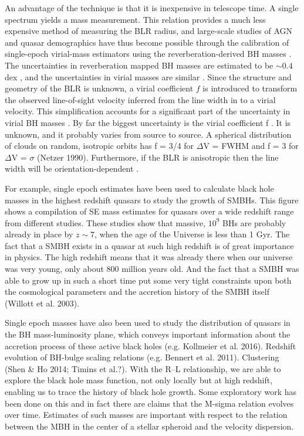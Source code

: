 An advantage of the technique is that it is inexpensive in telescope time. A single spectrum yields a mass measurement. 
This relation provides a much less expensive method of measuring the BLR radius, and large-scale studies of AGN and quasar demographics have thus become possible through the calibration of single-epoch virial-mass estimators using the reverberation-derived BH masses \citep[e.g.][]{greene05b,vestergaard06,vestergaard09,shen11,shen12,trakhtenbrot12}.
The uncertainties in reverberation mapped BH masses are estimated to be $\sim 0.4$ dex \citep[e.g.][]{peterson10}, and the uncertainties in virial masses are similar \citep[e.g.][]{vestergaard06}.
Since the structure and geometry of the BLR is unknown, a virial coefficient $f$ is introduced to transform the observed line-of-sight velocity inferred from the line width in to a virial velocity.
This simplification accounts for a significant part of the uncertainty in virial BH masses \citep[in addition to, for example, describing the BLR with a single radius $R$ and scatter in the $R-L$ relation;][]{shen13}. 
By far the biggest uncertainty is the virial coefficient f . 
It is unknown, and it probably varies from source to source.
A spherical distribution of clouds on random, isotropic orbits has f = 3/4 for $\Delta$V = FWHM and
f = 3 for $\Delta$V = $\sigma$ (Netzer 1990).
Furthermore, if the BLR is anisotropic \citep[for example, in a flattened disk; e.g.][]{jarvis06} then the line width will be orientation-dependent \citep[e.g.][]{runnoe13b,shen14,brotherton15}. 

For example, single epoch estimates have been used to calculate black hole masses in the highest redshift quasars to study the growth of SMBHs. 
This figure shows a compilation of SE mass estimates for quasars over a wide redshift range from different studies. 
These studies show that massive, $10^9$ BHs are probably already in place by $z\sim7$, when the age of the Universe is less than 1 Gyr.
The fact that a SMBH exists in a quasar at such high redshift is of great importance in physics.
The high redshift means that it was already there when our universe was very young, only about
800 million years old. And the fact that a SMBH was able to grow up in such a short time put
some very tight constraints upon both the cosmological parameters and the accretion history of the
SMBH itself (Willott et al. 2003).

Single epoch masses have also been used to study the distribution of quasars in the BH mass-luminosity plane, which conveys important information about the accretion process of these active black holes (e.g. Kollmeier et al. 2016). 
Redshift evolution of BH-bulge scaling relations (e.g. Bennert et al. 2011). 
Clustering (Shen \& Ho 2014; Timins et al.?). 
With the R–L relationship, we are able to explore the black hole mass function, not only locally but at high redshift, enabling us to trace the history of black hole growth.
Some exploratory work has been done on this and in fact there are claims that the M-sigma relation evolves over time. 
Estimates of such masses are important with respect to the relation between the MBH in the center of a stellar spheroid and the velocity dispersion. 


